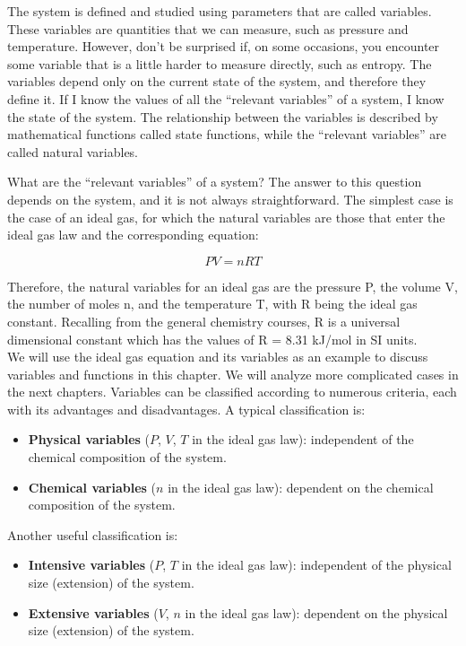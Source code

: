 \documentclass[
  9pt,
]{extbook}
\providecommand{\tightlist}{%
  \setlength{\itemsep}{0pt}\setlength{\parskip}{0pt}}
\theoremstyle{definition}
\theoremstyle{definition}
\theoremstyle{definition}
\theoremstyle{remark}
\begin{document}
The system is defined and studied using parameters that are called variables. These variables are quantities that we can measure, such as pressure and temperature. However, don't be surprised if, on some occasions, you encounter some variable that is a little harder to measure directly, such as entropy. The variables depend only on the current state of the system, and therefore they define it. If I know the values of all the ``relevant variables'' of a system, I know the state of the system. The relationship between the variables is described by mathematical functions called state functions, while the ``relevant variables'' are called natural variables.

What are the ``relevant variables'' of a system? The answer to this question depends on the system, and it is not always straightforward. The simplest case is the case of an ideal gas, for which the natural variables are those that enter the ideal gas law and the corresponding equation:

\begin{equation}
  PV=nRT       
  \label{eq:idealgaslaworiginal}
\end{equation}

Therefore, the natural variables for an ideal gas are the pressure P, the volume V, the number of moles n, and the temperature T, with R being the ideal gas constant. Recalling from the general chemistry courses, R is a universal dimensional constant which has the values of R = 8.31 kJ/mol in SI units.\\
We will use the ideal gas equation and its variables as an example to discuss variables and functions in this chapter. We will analyze more complicated cases in the next chapters.
Variables can be classified according to numerous criteria, each with its advantages and disadvantages. A typical classification is:

\begin{itemize}
\tightlist
\item
  \textbf{Physical variables} (\(P\), \(V\), \(T\) in the ideal gas law): independent of the chemical composition of the system.
\item
  \textbf{Chemical variables} (\(n\) in the ideal gas law): dependent on the chemical composition of the system.
\end{itemize}

Another useful classification is:

\begin{itemize}
\tightlist
\item
  \textbf{Intensive variables} (\(P\), \(T\) in the ideal gas law): independent of the physical size (extension) of the system.
\item
  \textbf{Extensive variables} (\(V\), \(n\) in the ideal gas law): dependent on the physical size (extension) of the system.
\end{itemize}
\end{document}

